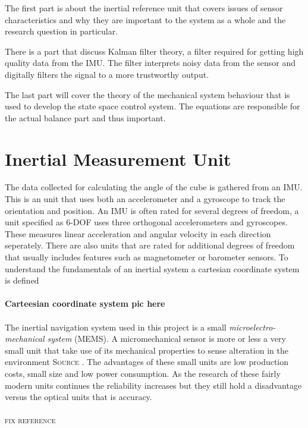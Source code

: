 \documentclass[a4paper,11pt]{kth-mag}
\begin{document}
The first part is about the inertial reference unit that covers issues of sensor characteristics and why they are important to the system as a whole and the research question in particular.

There is a part that discuss Kalman filter theory, a filter required for getting high quality data from the IMU. The filter interprets noisy data from the sensor and digitally filters the signal to a more trustworthy output. 

The last part will cover the theory of the mechanical system behaviour that is used to develop the state space control system. The equations are responsible for the actual balance part and thus important. 



\section{Inertial Measurement Unit}
The data collected for calculating the angle of the cube is gathered from an IMU. This is an unit that uses both an accelerometer and a gyroscope to track the orientation and position. An IMU is often rated for several degrees of freedom, a unit specified as 6-DOF uses three orthogonal accelerometers and gyroscopes. These measures linear acceleration and angular velocity in each direction seperately. There are also units that are rated for additional degrees of freedom that usually includes features such as magnetometer or barometer sensors.   
To understand the fundamentals of an inertial system a cartesian coordinate system is defined
\\ \\
\textbf{Carteesian coordinate system pic here}
\\ \\

The inertial navigation system used in this project is a small \textit{microelectro-mechanical system} (MEMS). A micromechanical sensor is more or less a very small unit that take use of its mechanical properties to sense alteration in the environment \textsc{Source} . The advantages of these small units are low production costs, small size and low power consumption. As the research of these fairly modern units continues the reliability increases but they still hold a disadvantage versus the optical units that is accuracy.
\\ \\ \textsc{fix reference}
\end{document}
